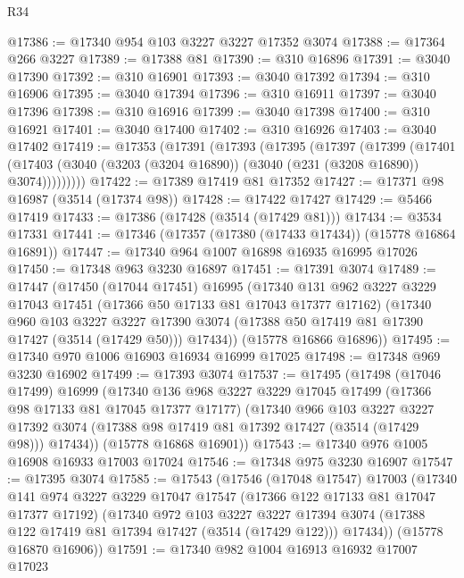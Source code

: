 \begin{lexlean}{R34}
\begin{coremodule}
@17386 := @17340 @954 @103 @3227 @3227 @17352 @3074
@17388 := @17364 @266 @3227
@17389 := @17388 @81
@17390 := @310 @16896
@17391 := @3040 @17390
@17392 := @310 @16901
@17393 := @3040 @17392
@17394 := @310 @16906
@17395 := @3040 @17394
@17396 := @310 @16911
@17397 := @3040 @17396
@17398 := @310 @16916
@17399 := @3040 @17398
@17400 := @310 @16921
@17401 := @3040 @17400
@17402 := @310 @16926
@17403 := @3040 @17402
@17419 := @17353
    (@17391
      (@17393
        (@17395
          (@17397
            (@17399
              (@17401
                (@17403 (@3040 (@3203 (@3204 @16890)) (@3040 (@231 (@3208 @16890)) @3074)))))))))
@17422 := @17389 @17419 @81 @17352
@17427 := @17371 @98 @16987 (@3514 (@17374 @98))
@17428 := @17422 @17427
@17429 := @5466 @17419
@17433 := @17386 (@17428 (@3514 (@17429 @81)))
@17434 := @3534 @17331
@17441 := @17346 (@17357 (@17380 (@17433 @17434)) (@15778 @16864 @16891))
@17447 := @17340 @964 @1007 @16898 @16935 @16995 @17026
@17450 := @17348 @963 @3230 @16897
@17451 := @17391 @3074
@17489 := @17447
    (@17450
      (@17044 @17451)
      @16995
      (@17340
        @131
        @962
        @3227
        @3229
        @17043
        @17451
        (@17366 @50 @17133 @81 @17043 @17377 @17162)
        (@17340
          @960
          @103
          @3227
          @3227
          @17390
          @3074
          (@17388 @50 @17419 @81 @17390 @17427 (@3514 (@17429 @50)))
          @17434))
      (@15778 @16866 @16896))
@17495 := @17340 @970 @1006 @16903 @16934 @16999 @17025
@17498 := @17348 @969 @3230 @16902
@17499 := @17393 @3074
@17537 := @17495
    (@17498
      (@17046 @17499)
      @16999
      (@17340
        @136
        @968
        @3227
        @3229
        @17045
        @17499
        (@17366 @98 @17133 @81 @17045 @17377 @17177)
        (@17340
          @966
          @103
          @3227
          @3227
          @17392
          @3074
          (@17388 @98 @17419 @81 @17392 @17427 (@3514 (@17429 @98)))
          @17434))
      (@15778 @16868 @16901))
@17543 := @17340 @976 @1005 @16908 @16933 @17003 @17024
@17546 := @17348 @975 @3230 @16907
@17547 := @17395 @3074
@17585 := @17543
    (@17546
      (@17048 @17547)
      @17003
      (@17340
        @141
        @974
        @3227
        @3229
        @17047
        @17547
        (@17366 @122 @17133 @81 @17047 @17377 @17192)
        (@17340
          @972
          @103
          @3227
          @3227
          @17394
          @3074
          (@17388 @122 @17419 @81 @17394 @17427 (@3514 (@17429 @122)))
          @17434))
      (@15778 @16870 @16906))
@17591 := @17340 @982 @1004 @16913 @16932 @17007 @17023

\end{coremodule}
\end{lexlean}
